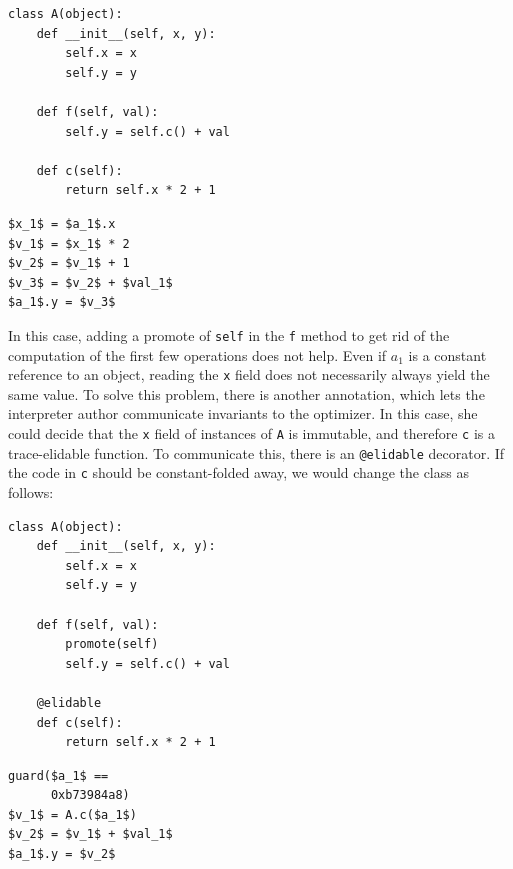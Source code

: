 \documentclass{sigplanconf}
\begin{document}
\begin{minipage}[t]{0.6\linewidth}
\centering
\begin{lstlisting}[mathescape,basicstyle=\ttfamily]
class A(object):
    def __init__(self, x, y):
        self.x = x
        self.y = y

    def f(self, val):
        self.y = self.c() + val

    def c(self):
        return self.x * 2 + 1
\end{lstlisting}
\end{minipage}
\vline
\hspace{0.5cm}
\begin{minipage}[t]{0.4\linewidth}
\begin{lstlisting}[mathescape,basicstyle=\ttfamily]
$x_1$ = $a_1$.x
$v_1$ = $x_1$ * 2
$v_2$ = $v_1$ + 1
$v_3$ = $v_2$ + $val_1$
$a_1$.y = $v_3$
\end{lstlisting}
\end{minipage}

In this case, adding a promote of \texttt{self} in the \texttt{f} method to get rid of the
computation of the first few operations does not help. Even if $a_1$ is a
constant reference to an object, reading the \texttt{x} field does not necessarily
always yield the same value. To solve this problem, there is another annotation,
which lets the interpreter author communicate invariants to the optimizer. In
this case, she could decide that the \texttt{x} field of instances of \texttt{A} is
immutable, and therefore \texttt{c}
is a trace-elidable function. To communicate this, there is an \texttt{@elidable} decorator.
If the code in \texttt{c} should be constant-folded away, we would change the
class as follows:

\begin{minipage}[t]{0.6\linewidth}
\centering
\begin{lstlisting}[mathescape,basicstyle=\ttfamily]
class A(object):
    def __init__(self, x, y):
        self.x = x
        self.y = y

    def f(self, val):
        promote(self)
        self.y = self.c() + val

    @elidable
    def c(self):
        return self.x * 2 + 1
\end{lstlisting}
\end{minipage}
\vline
\hspace{0.4cm}
\begin{minipage}[t]{0.4\linewidth}
\begin{lstlisting}[mathescape,basicstyle=\ttfamily]
guard($a_1$ == 
      0xb73984a8)
$v_1$ = A.c($a_1$)
$v_2$ = $v_1$ + $val_1$
$a_1$.y = $v_2$
\end{lstlisting}
\end{minipage}
\end{document}
